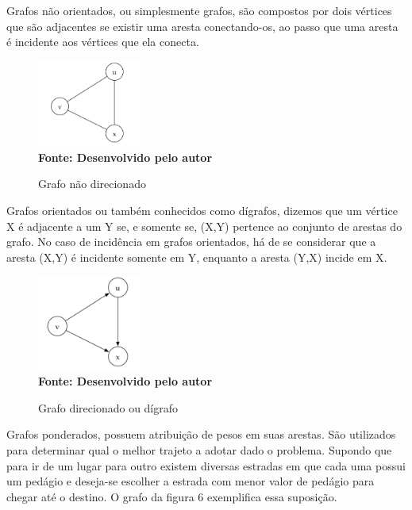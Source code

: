Grafos não orientados, ou simplesmente grafos, são compostos por dois vértices que são adjacentes se existir uma aresta conectando-os, ao passo que uma aresta é incidente aos vértices que ela conecta. 

\begin{figure}[ht]
	\centering	
	\caption[\hspace{0.1cm}Grafo não direcionado.]{Grafo não direcionado}
	\vspace{-0.4cm}
	\includegraphics[width=0.3\textwidth]{figuras/grafo-nao-direcionado.png}
	 \vspace{-0.2cm}
	\\\textbf{\footnotesize Fonte: Desenvolvido pelo autor}
	\label{fig:figura1}
\end{figure}

Grafos orientados ou também conhecidos como dígrafos, dizemos que um vértice X é adjacente a um Y se, e somente se, (X,Y) pertence ao conjunto de arestas do grafo. No caso de incidência em grafos orientados, há de se considerar que a aresta (X,Y) é incidente somente em Y, enquanto a aresta (Y,X) incide em X.

\begin{figure}[ht]
	\centering	
	\caption[\hspace{0.1cm}Grafo direcionado ou dígrafo.]{Grafo direcionado ou dígrafo}
	\vspace{-0.4cm}
	\includegraphics[width=0.3\textwidth]{figuras/grafo-direcionado.png}
	 \vspace{-0.2cm}
	\\\textbf{\footnotesize Fonte: Desenvolvido pelo autor}
	\label{fig:figura1}
\end{figure}

Grafos ponderados, possuem atribuição de pesos em suas arestas. São utilizados para determinar qual o melhor trajeto a adotar dado o problema. Supondo que para ir de um lugar para outro existem diversas estradas em que cada uma possui um pedágio e deseja-se escolher a estrada com menor valor de pedágio para chegar até o destino. O grafo da figura 6 exemplifica essa suposição.

